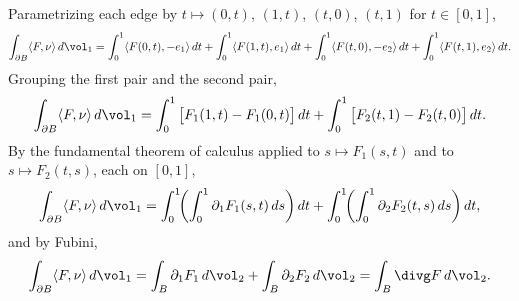 \begin{example}
Parametrizing each edge by $t \mapsto (0,t)$, $(1,t)$, $(t,0)$, $(t,1)$ for $t \in [0,1]$,
\[
\int_{\partial B} \langle F,\nu\rangle\,d\vol_1
  = \int_0^1 \langle F(0,t),-e_1\rangle\,dt + \int_0^1 \langle F(1,t),e_1\rangle\,dt
  + \int_0^1 \langle F(t,0),-e_2\rangle\,dt + \int_0^1 \langle F(t,1),e_2\rangle\,dt.
\]
Grouping the first pair and the second pair,
\[
\int_{\partial B} \langle F,\nu\rangle\,d\vol_1
  = \int_0^1 \big[F_1(1,t) - F_1(0,t)\big]\,dt + \int_0^1 \big[F_2(t,1) - F_2(t,0)\big]\,dt.
\]
By the fundamental theorem of calculus applied to $s \mapsto F_1(s,t)$ and to
$s \mapsto F_2(t,s)$, each on $[0,1]$,
\[
\int_{\partial B} \langle F,\nu\rangle\,d\vol_1
  = \int_0^1\!\!\left(\int_0^1 \partial_1 F_1(s,t)\,ds\right) dt
  + \int_0^1\!\!\left(\int_0^1 \partial_2 F_2(t,s)\,ds\right) dt,
\]
and by Fubini,
\[
\int_{\partial B} \langle F,\nu\rangle\,d\vol_1
  = \int_B \partial_1 F_1\,d\vol_2 + \int_B \partial_2 F_2\,d\vol_2
  = \int_B \divg F\,d\vol_2.
\]
\end{example}
